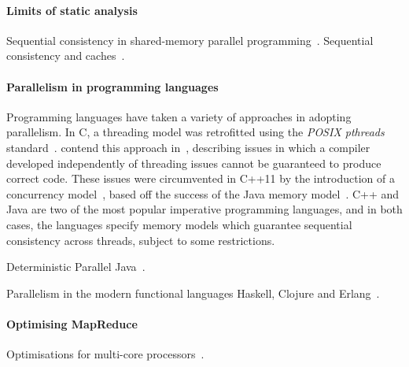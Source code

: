 \paragraph{Limits of static analysis} Sequential consistency in
shared-memory parallel
programming~\cite{Krishnamurthy1995,Shasha1988,Sura2005}. Sequential
consistency and caches~\cite{Goodman}.

\paragraph{Parallelism in programming languages} Programming languages
have taken a variety of approaches in adopting parallelism. In C, a
threading model was retrofitted using the \textit{POSIX pthreads}
standard~\cite{Sura2005}. \citeauthor{Boehm2005} contend this approach
in~\cite{Boehm2005}, describing issues in which a compiler developed
independently of threading issues cannot be guaranteed to produce
correct code. These issues were circumvented in C++11 by the
introduction of a concurrency model~\cite{Boehm2008}, based off the
success of the Java memory model~\cite{Bash2015a}. C++ and Java are
two of the most popular imperative programming languages, and in both
cases, the languages specify memory models which guarantee sequential
consistency across threads, subject to some restrictions.

Deterministic Parallel Java~\cite{Bocchino2009}.

Parallelism in the modern functional languages Haskell, Clojure and
Erlang~\cite{Pierro2012}.









\paragraph{Optimising MapReduce} Optimisations for multi-core
processors~\cite{Kaashoek2010}.


